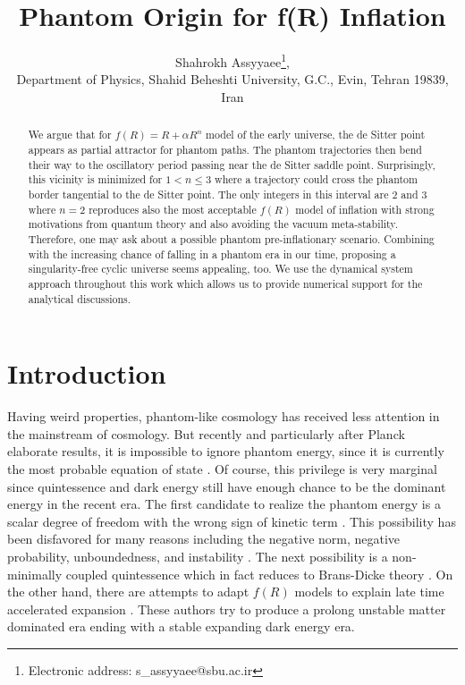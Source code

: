 \documentclass[a4paper,11pt]{article}
\begin{document}
\title{\bf  Phantom Origin for f(R) Inflation}
\author{Shahrokh Assyyaee\thanks{Electronic address: s\_assyyaee@sbu.ac.ir}\;,\;\;
\\
\small Department of Physics, Shahid Beheshti University, G.C., Evin, Tehran 19839,  Iran}
\maketitle
\begin{abstract}
We argue that for $f(R)=R+\alpha R^n$ model of the early universe, the de Sitter point appears as  partial attractor for phantom paths. The phantom trajectories then bend their way to the oscillatory period passing near the de Sitter saddle point. Surprisingly, this vicinity is minimized for $1<n\le 3$ where a trajectory could cross the phantom border tangential to the de Sitter point. The only integers in this interval are $2$ and $3$ where $n=2$ reproduces also the most acceptable $f(R)$ model of inflation with strong motivations from quantum theory and also avoiding the vacuum meta-stability. Therefore, one may ask about a possible phantom pre-inflationary scenario. Combining with the increasing chance of falling in a phantom era in our time, proposing a singularity-free cyclic universe seems appealing, too. We use the dynamical system approach throughout this work which allows us to provide numerical support for the analytical discussions.    
\end{abstract}
\maketitle
\section{Introduction}
Having weird properties, phantom-like cosmology \cite{neg,qdc} has received less attention in the mainstream of cosmology. But recently and particularly after Planck elaborate results, it is impossible to ignore phantom energy, since it is currently the most probable equation of state \cite{Pk1,Pk2,phm,cid,dpe,bde}. Of course, this privilege is very marginal since quintessence and dark energy still have enough chance to be the dominant energy in the recent era. The first candidate to realize the phantom energy is a scalar degree of freedom with the wrong sign of kinetic term \cite{neg}. This possibility has been disfavored for many reasons including the negative norm, negative probability, unboundedness, and instability \cite{prm}. The next possibility is a non-minimally coupled quintessence \cite{ama2} which in fact reduces to Brans-Dicke theory \cite{ama2,beg}. On the other hand, there are attempts to adapt $f(R)$ models \cite{beg} to explain late time accelerated expansion \cite{bois,mgwn,gann,moto,cerv,barv,yoko,vik,ama1,ama3,mdp}. These authors try to produce a prolong unstable matter dominated era ending with a stable expanding dark energy era.
\end{document}
